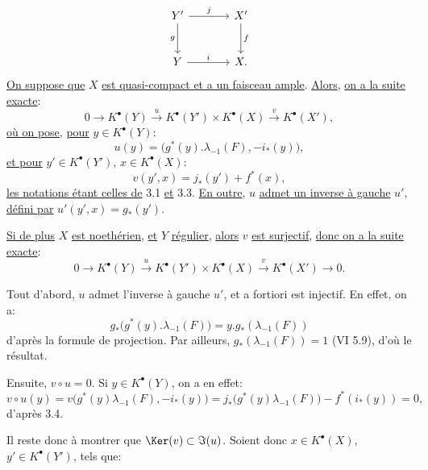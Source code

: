 
\[
\begin{tikzcd}[column sep=large,row sep=large]
Y' \arrow[r,"j"] \arrow[d,"g"'] & X' \arrow[d,"f"]\\
Y \arrow[r,"i"] & X.
\end{tikzcd}
\]
\uline{On
suppose que} \(X\) \uline{est quasi-compact et a un faisceau ample}. \uline{Alors}, \uline{on a la suite exacte}:
\[
0\longrightarrow K^{\bullet}(Y)\xrightarrow{u}K^{\bullet}(Y')\times K^{\bullet}(X)
\xrightarrow{v}K^{\bullet}(X'),
\]
\uline{où on pose}, \uline{pour} \(y\in K^{\bullet}(Y)\):
\[
u(y)=\bigl(g^*(y).\lambda_{-1}(F),-i_*(y)\bigr),
\]
\uline{et pour} \(y'\in K^{\bullet}(Y')\), \(x\in K^{\bullet}(X)\):
\[
v(y',x)=j_*(y')+f^*(x),
\]
\uline{les notations étant celles de} 3.1 \uline{et} 3.3. \uline{En outre}, \(u\) \uline{admet un inverse à gauche} \(u'\), \uline{défini par} \(u'(y',x)=g_*(y')\).

\uline{Si de plus} \(X\) \uline{est noethérien}, \uline{et} \(Y\) \uline{régulier}, \uline{alors} \(v\) \uline{est surjectif}, \uline{donc on a la suite exacte}:
\[
0\longrightarrow K^{\bullet}(Y)\xrightarrow{u}K^{\bullet}(Y')\times K^{\bullet}(X)
\xrightarrow{v}K^{\bullet}(X')\longrightarrow0.
\]

Tout d'abord, \(u\) admet l'inverse à gauche \(u'\), et a fortiori est injectif. En effet, on a:
\[
g_*\bigl(g^*(y).\lambda_{-1}(F)\bigr)
=y.g_*(\lambda_{-1}(F))
\]
d'après la formule de projection. Par ailleurs, \(g_*(\lambda_{-1}(F))=1\) (VI 5.9), d'où le résultat.

Ensuite, \(v\circ u=0\). Si \(y\in K^{\bullet}(Y)\), on a en effet:
\[
v\circ u(y)
=v\bigl(g^*(y)\lambda_{-1}(F),-i_*(y)\bigr)
=j_*\bigl(g^*(y)\lambda_{-1}(F)\bigr)-f^*(i_*(y))=0,
\]
d'après 3.4.

Il reste donc à montrer que \(\Ker(v)\subset \Im(u)\). Soient donc \(x\in K^{\bullet}(X)\), \(y'\in K^{\bullet}(Y')\), tels que:
